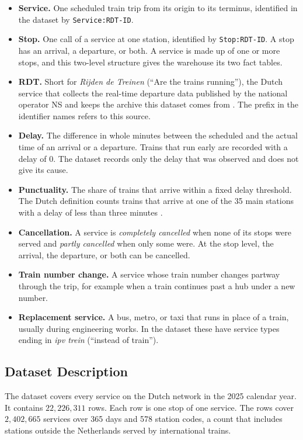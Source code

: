 \begin{itemize}
    \item \textbf{Service.} One scheduled train trip from its origin to its terminus, identified in the dataset by \texttt{Service:RDT-ID}.
    \item \textbf{Stop.} One call of a service at one station, identified by \texttt{Stop:RDT-ID}. A stop has an arrival, a departure, or both. A service is made up of one or more stops, and this two-level structure gives the warehouse its two fact tables.
    \item \textbf{RDT.} Short for \emph{Rijden de Treinen} (``Are the trains running''), the Dutch service that collects the real-time departure data published by the national operator NS and keeps the archive this dataset comes from \cite{rijdendetreinen, szarnyas2024railway}. The prefix in the identifier names refers to this source.
    \item \textbf{Delay.} The difference in whole minutes between the scheduled and the actual time of an arrival or a departure. Trains that run early are recorded with a delay of 0. The dataset records only the delay that was observed and does not give its cause.
    \item \textbf{Punctuality.} The share of trains that arrive within a fixed delay threshold. The Dutch definition counts trains that arrive at one of the 35 main stations with a delay of less than three minutes \cite{kroon2008dutch}.
    \item \textbf{Cancellation.} A service is \emph{completely cancelled} when none of its stops were served and \emph{partly cancelled} when only some were. At the stop level, the arrival, the departure, or both can be cancelled.
    \item \textbf{Train number change.} A service whose train number changes partway through the trip, for example when a train continues past a hub under a new number.
    \item \textbf{Replacement service.} A bus, metro, or taxi that runs in place of a train, usually during engineering works. In the dataset these have service types ending in \emph{ipv trein} (``instead of train'').
\end{itemize}

\subsection{Dataset Description}
\label{subsec:dataset}

The dataset covers every service on the Dutch network in the 2025 calendar year. It contains $22{,}226{,}311$ rows. Each row is one stop of one service. The rows cover $2{,}402{,}665$ services over 365 days and 578 station codes, a count that includes stations outside the Netherlands served by international trains.

